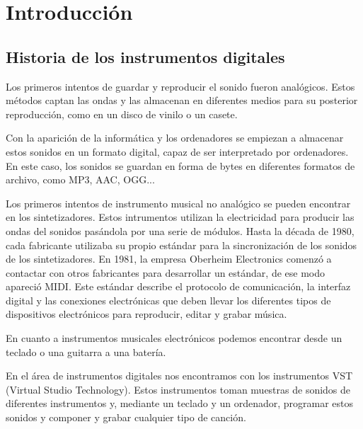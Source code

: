 
\chapter{Introducción} %
\label{cha:Introduccion}

    \section{Historia de los instrumentos digitales} %
    \label{sec:HistoriaDeLosInstrumentosDigitales}

        Los primeros intentos de guardar y reproducir el sonido fueron analógicos. Estos métodos captan las ondas y las
        almacenan en diferentes medios para su posterior reproducción, como en un disco de vinilo o un casete.

        Con la aparición de la informática y los ordenadores se empiezan a almacenar estos sonidos en un formato
        digital, capaz de ser interpretado por ordenadores. En este caso, los sonidos se guardan en forma de bytes en
        diferentes formatos de archivo, como MP3, AAC, OGG...

        Los primeros intentos de instrumento musical no analógico se pueden encontrar en los sintetizadores. Estos
        intrumentos utilizan la electricidad para producir las ondas del sonidos pasándola por una serie de módulos.
        Hasta la década de 1980, cada fabricante utilizaba su propio estándar para la sincronización de los sonidos de
        los sintetizadores. En 1981, la empresa Oberheim Electronics comenzó a contactar con otros fabricantes para
        desarrollar un estándar, de ese modo apareció MIDI. Este estándar describe el protocolo de comunicación, la
        interfaz digital y las conexiones electrónicas que deben llevar los diferentes tipos de dispositivos
        electrónicos para reproducir, editar y grabar música\cite{midi_wikipedia}.

        En cuanto a instrumentos musicales electrónicos podemos encontrar desde un teclado o una guitarra a una batería.

        En el área de instrumentos digitales nos encontramos con los instrumentos VST (Virtual Studio Technology). Estos
        instrumentos toman muestras de sonidos de diferentes instrumentos y, mediante un teclado y un ordenador,
        programar estos sonidos y componer y grabar cualquier tipo de canción.\cite{historia_instrumentos_digitales}
        
